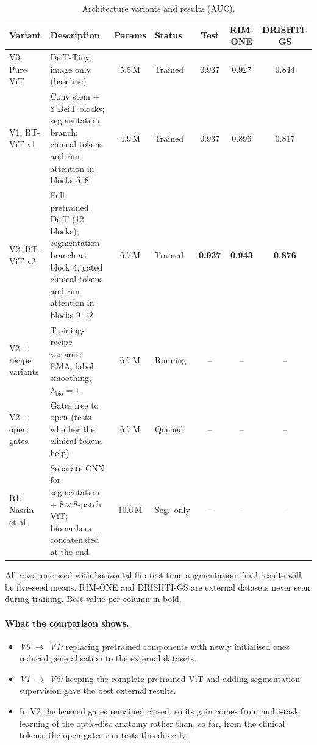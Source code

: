 \documentclass[10pt]{article}
\begin{document}
\begin{table}[h]
\centering
\begin{threeparttable}
\caption{Architecture variants and results (AUC).}
\label{tab:variants}
\footnotesize
\setlength{\tabcolsep}{3.5pt}
\begin{tabular}{@{}l p{6.2cm} c l ccc@{}}
\toprule
Variant & Description & Params & Status & Test & RIM-ONE & DRISHTI-GS \\
\midrule
V0: Pure ViT & DeiT-Tiny, image only (baseline) & 5.5\,M & Trained & 0.937 & 0.927 & 0.844 \\
V1: BT-ViT v1 & Conv stem + 8 DeiT blocks; segmentation branch; clinical tokens and rim attention in
blocks 5--8 & 4.9\,M & Trained & 0.937 & 0.896 & 0.817 \\
V2: BT-ViT v2 & Full pretrained DeiT (12 blocks); segmentation branch at block 4; gated clinical tokens and
rim attention in blocks 9--12 & 6.7\,M & Trained & \textbf{0.937} & \textbf{0.943} & \textbf{0.876} \\
\midrule
V2 + recipe variants & Training-recipe variants: EMA, label smoothing, $\lambda_{\mathrm{bio}}=1$ & 6.7\,M & Running & -- & -- & -- \\
V2 + open gates & Gates free to open (tests whether the clinical tokens help) & 6.7\,M & Queued & -- & -- & -- \\
B1: Nasrin et al.~\cite{nasrin2026} & Separate CNN for segmentation + $8{\times}8$-patch ViT; biomarkers
concatenated at the end & 10.6\,M & Seg.\ only & -- & -- & -- \\
\bottomrule
\end{tabular}
\begin{tablenotes}\footnotesize
\item[] All rows: one seed with horizontal-flip test-time augmentation; final results will be five-seed means.
RIM-ONE and DRISHTI-GS are external datasets never seen during training. Best value per column in bold.
\end{tablenotes}
\end{threeparttable}
\end{table}

\paragraph{What the comparison shows.}
\begin{itemize}
\item \emph{V0 $\to$ V1:} replacing pretrained components with newly initialised ones reduced generalisation
to the external datasets.
\item \emph{V1 $\to$ V2:} keeping the complete pretrained ViT and adding segmentation supervision gave the
best external results.
\item In V2 the learned gates remained closed, so its gain comes from multi-task learning of the optic-disc
anatomy rather than, so far, from the clinical tokens; the open-gates run tests this directly.
\end{itemize}
\end{document}

